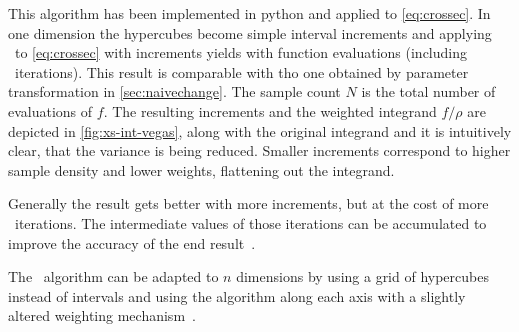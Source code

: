 %
This algorithm has been implemented in python and applied to
\cref{eq:crossec}.  In one dimension the hypercubes become simple
interval increments and applying \vegas\ to \cref{eq:crossec} with
 increments yields
 with
 function evaluations (including
\vegas\ iterations). This result is comparable with tho one obtained
by parameter transformation in \cref{sec:naivechange}.  The sample
count \(N\) is the total number of evaluations of \(f\). The resulting
increments and the weighted integrand \(f/\rho\) are depicted in
\cref{fig:xs-int-vegas}, along with the original integrand and it is
intuitively clear, that the variance is being reduced. Smaller
increments correspond to higher sample density and lower weights,
flattening out the integrand.

Generally the result gets better with more increments, but at the cost
of more \vegas\ iterations. The intermediate values of those
iterations can be accumulated to improve the accuracy of the end
result~\cite[197]{Lepage:19781an}.

The \vegas\ algorithm can be adapted to \(n\) dimensions by using a
grid of hypercubes instead of intervals and using the algorithm along
each axis with a slightly altered weighting
mechanism~\cite[197]{Lepage:19781an}.

